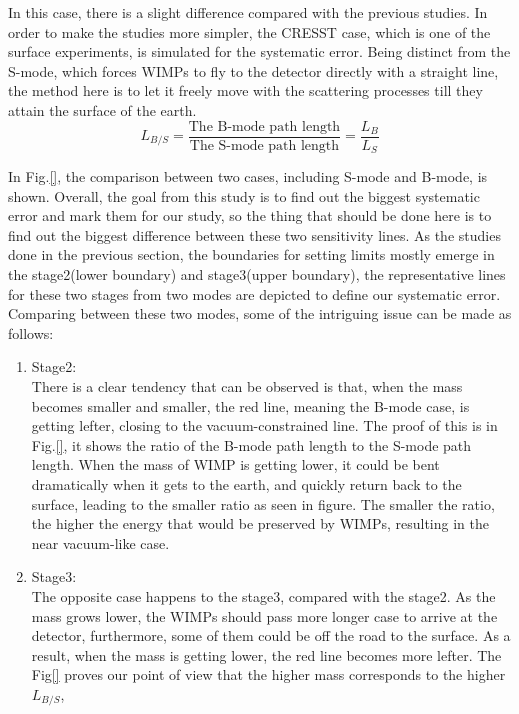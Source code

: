 In this case, there is a slight difference compared with the previous studies. In order to make the studies more simpler, the CRESST case, which is one of the surface experiments, is simulated for the systematic error. Being distinct from the S-mode, which forces WIMPs to fly to the detector directly with a straight line, the method here is to let it freely move with the scattering processes till they attain the surface of the earth.\\ 

\begin{equation}
\label{Interaction count modification}
L_{B/S} = \frac{ \text{The B-mode path length}}{\text{The S-mode path length}} = \frac{L_{B}}{L_{S}}
\end{equation}

In Fig.\ref{}, the comparison between two cases, including S-mode and B-mode, is shown. Overall, the goal from this study is to find out the biggest systematic error and mark them for our study, so the thing that should be done here is to find out the biggest difference between these two sensitivity lines. As the studies done in the previous section, the boundaries for setting limits mostly emerge in the stage2(lower boundary) and stage3(upper boundary), the representative lines for these two stages from two modes are depicted to define our systematic error. Comparing between these two modes, some of the intriguing issue can be made as follows:

\begin{enumerate}
\item  Stage2:\\
There is a clear tendency that can be observed is that, when the mass becomes smaller and smaller, the red line, meaning the B-mode case, is getting lefter, closing to the vacuum-constrained line. The proof of this is in Fig.\ref{}, it shows the ratio of the B-mode path length to the S-mode path length. When the mass of WIMP is getting lower, it could be bent dramatically when it gets to the earth, and quickly return back to the surface, leading to the smaller ratio as seen in figure. The smaller the ratio, the higher the energy that would be preserved by WIMPs, resulting in the near vacuum-like case. 
\item  Stage3:\\
The opposite case happens to the stage3, compared with the stage2. As the mass grows lower, the WIMPs should pass more longer case to arrive at the detector, furthermore, some of them could be off the road to the surface. As a result, when the mass is getting lower, the red line becomes more lefter. The Fig\ref{} proves our point of view that the higher mass corresponds to the higher $L_{B/S}$, 
\end{enumerate}

